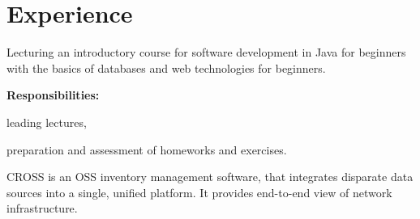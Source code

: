 \documentclass[a4paper]{deedy-resume}
\begin{document}
\section{Experience}
\vspace{\topsep}
Lecturing an introductory course for software development in Java for beginners with the basics of databases and web technologies for beginners.

\vspace{4pt}
\textbf{Responsibilities:}
\begin{tightitemize}
    \item leading lectures,
    \item preparation and assessment of homeworks and exercises.
\end{tightitemize}
\sectionspace
CROSS is an OSS inventory management software, that integrates disparate data sources into a single, unified platform. It provides end-to-end view of network infrastructure.
\end{document}
